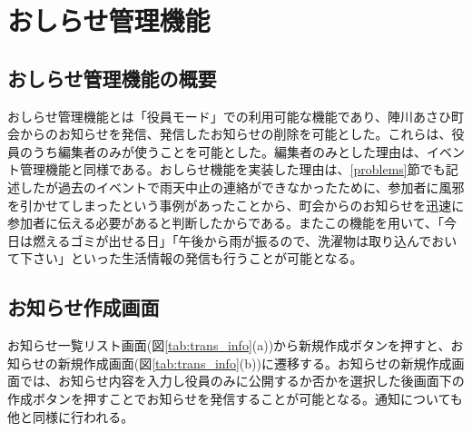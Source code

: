 \section{おしらせ管理機能}%
\subsection{おしらせ管理機能の概要}%
おしらせ管理機能とは「役員モード」での利用可能な機能であり、陣川あさひ町会からのお知らせを発信、発信したお知らせの削除を可能とした。これらは、役員のうち編集者のみが使うことを可能とした。編集者のみとした理由は、イベント管理機能と同様である。おしらせ機能を実装した理由は、\ref{problems}節でも記述したが過去のイベントで雨天中止の連絡ができなかったために、参加者に風邪を引かせてしまったという事例があったことから、町会からのお知らせを迅速に参加者に伝える必要があると判断したからである。またこの機能を用いて、「今日は燃えるゴミが出せる日」「午後から雨が振るので、洗濯物は取り込んでおいて下さい」といった生活情報の発信も行うことが可能となる。


\subsection{お知らせ作成画面}%
お知らせ一覧リスト画面(図\ref{tab:trans_info}(a))から新規作成ボタンを押すと、お知らせの新規作成画面(図\ref{tab:trans_info}(b))に遷移する。お知らせの新規作成画面では、お知らせ内容を入力し役員のみに公開するか否かを選択した後画面下の作成ボタンを押すことでお知らせを発信することが可能となる。通知についても他と同様に行われる。

